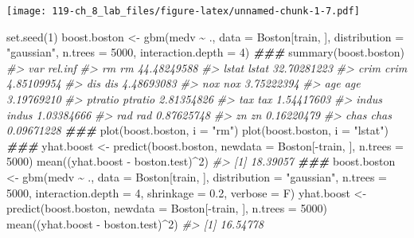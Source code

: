 \documentclass[
]{book}
\newenvironment{Shaded}{\begin{snugshade}}{\end{snugshade}}
\newcommand{\AttributeTok}[1]{\textcolor[rgb]{0.77,0.63,0.00}{#1}}
\newcommand{\CommentTok}[1]{\textcolor[rgb]{0.56,0.35,0.01}{\textit{#1}}}
\newcommand{\DecValTok}[1]{\textcolor[rgb]{0.00,0.00,0.81}{#1}}
\newcommand{\DocumentationTok}[1]{\textcolor[rgb]{0.56,0.35,0.01}{\textbf{\textit{#1}}}}
\newcommand{\FloatTok}[1]{\textcolor[rgb]{0.00,0.00,0.81}{#1}}
\newcommand{\FunctionTok}[1]{\textcolor[rgb]{0.00,0.00,0.00}{#1}}
\newcommand{\NormalTok}[1]{#1}
\newcommand{\OtherTok}[1]{\textcolor[rgb]{0.56,0.35,0.01}{#1}}
\newcommand{\SpecialCharTok}[1]{\textcolor[rgb]{0.00,0.00,0.00}{#1}}
\newcommand{\StringTok}[1]{\textcolor[rgb]{0.31,0.60,0.02}{#1}}
\begin{document}
\texttt{[image: 119-ch\_8\_lab\_files/figure-latex/unnamed-chunk-1-7.pdf]}

\begin{Shaded}
\begin{Highlighting}[]
\FunctionTok{set.seed}\NormalTok{(}\DecValTok{1}\NormalTok{)}
\NormalTok{boost.boston }\OtherTok{\textless{}{-}} \FunctionTok{gbm}\NormalTok{(medv }\SpecialCharTok{\textasciitilde{}}\NormalTok{ ., }\AttributeTok{data =}\NormalTok{ Boston[train, ],}
                    \AttributeTok{distribution =} \StringTok{"gaussian"}\NormalTok{, }\AttributeTok{n.trees =} \DecValTok{5000}\NormalTok{,}
                    \AttributeTok{interaction.depth =} \DecValTok{4}\NormalTok{)}
\DocumentationTok{\#\#\#}
\FunctionTok{summary}\NormalTok{(boost.boston)}
\CommentTok{\#\textgreater{}             var     rel.inf}
\CommentTok{\#\textgreater{} rm           rm 44.48249588}
\CommentTok{\#\textgreater{} lstat     lstat 32.70281223}
\CommentTok{\#\textgreater{} crim       crim  4.85109954}
\CommentTok{\#\textgreater{} dis         dis  4.48693083}
\CommentTok{\#\textgreater{} nox         nox  3.75222394}
\CommentTok{\#\textgreater{} age         age  3.19769210}
\CommentTok{\#\textgreater{} ptratio ptratio  2.81354826}
\CommentTok{\#\textgreater{} tax         tax  1.54417603}
\CommentTok{\#\textgreater{} indus     indus  1.03384666}
\CommentTok{\#\textgreater{} rad         rad  0.87625748}
\CommentTok{\#\textgreater{} zn           zn  0.16220479}
\CommentTok{\#\textgreater{} chas       chas  0.09671228}
\DocumentationTok{\#\#\#}
\FunctionTok{plot}\NormalTok{(boost.boston, }\AttributeTok{i =} \StringTok{"rm"}\NormalTok{)}
\FunctionTok{plot}\NormalTok{(boost.boston, }\AttributeTok{i =} \StringTok{"lstat"}\NormalTok{)}
\DocumentationTok{\#\#\#}
\NormalTok{yhat.boost }\OtherTok{\textless{}{-}} \FunctionTok{predict}\NormalTok{(boost.boston,}
                      \AttributeTok{newdata =}\NormalTok{ Boston[}\SpecialCharTok{{-}}\NormalTok{train, ], }\AttributeTok{n.trees =} \DecValTok{5000}\NormalTok{)}
\FunctionTok{mean}\NormalTok{((yhat.boost }\SpecialCharTok{{-}}\NormalTok{ boston.test)}\SpecialCharTok{\^{}}\DecValTok{2}\NormalTok{)}
\CommentTok{\#\textgreater{} [1] 18.39057}
\DocumentationTok{\#\#\#}
\NormalTok{boost.boston }\OtherTok{\textless{}{-}} \FunctionTok{gbm}\NormalTok{(medv }\SpecialCharTok{\textasciitilde{}}\NormalTok{ ., }\AttributeTok{data =}\NormalTok{ Boston[train, ],}
                    \AttributeTok{distribution =} \StringTok{"gaussian"}\NormalTok{, }\AttributeTok{n.trees =} \DecValTok{5000}\NormalTok{,}
                    \AttributeTok{interaction.depth =} \DecValTok{4}\NormalTok{, }\AttributeTok{shrinkage =} \FloatTok{0.2}\NormalTok{, }\AttributeTok{verbose =}\NormalTok{ F)}
\NormalTok{yhat.boost }\OtherTok{\textless{}{-}} \FunctionTok{predict}\NormalTok{(boost.boston,}
                      \AttributeTok{newdata =}\NormalTok{ Boston[}\SpecialCharTok{{-}}\NormalTok{train, ], }\AttributeTok{n.trees =} \DecValTok{5000}\NormalTok{)}
\FunctionTok{mean}\NormalTok{((yhat.boost }\SpecialCharTok{{-}}\NormalTok{ boston.test)}\SpecialCharTok{\^{}}\DecValTok{2}\NormalTok{)}
\CommentTok{\#\textgreater{} [1] 16.54778}


\end{Highlighting}
\end{Shaded}
\end{document}
